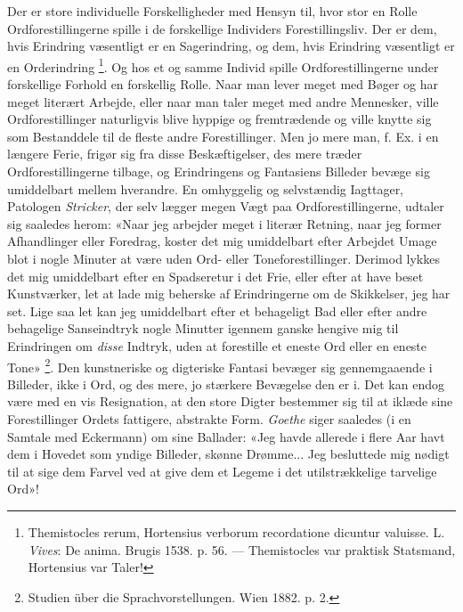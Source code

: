 \documentclass[12pt,a4paper,openany]{book}
\newcommand{\opage}[1]{\marginnote{\footnotesize\textit{[#1]}}}
\begin{document}
Der er store individuelle Forskelligheder med Hensyn til, hvor stor en Rolle
Ordforestillingerne spille i de forskellige Individers Forestillingsliv. Der er
dem, hvis Erindring væsentligt er en Sagerindring, og dem, hvis Erindring
væsentligt er en Orderindring%
\footnote[1]{Themistocles rerum, Hortensius verborum recordatione dicuntur
valuisse. L. \emph{Vives}: De anima. Brugis 1538. p. 56. --- Themistocles var
praktisk Statsmand, Hortensius var Taler!}. Og hos et og samme Individ spille
Ordforestillingerne under forskellige Forhold en forskellig Rolle. Naar man
lever meget med Bøger og har meget literært Arbejde, eller naar man taler meget
med andre Mennesker, ville Ordforestillinger naturligvis blive hyppige og
fremtrædende og ville knytte sig som Bestanddele til de fleste andre
Forestillinger. Men jo mere man, f. Ex. i en længere Ferie, frigør sig fra
disse Beskæftigelser, des mere træder Ordforestillingerne tilbage, og
Erindringens og Fantasiens Billeder bevæge sig umiddelbart mellem hverandre. En
omhyggelig og selvstændig Iagttager, Patologen \emph{Stricker}, der selv lægger
megen Vægt paa Ordforestillingerne, udtaler sig saaledes herom: «Naar jeg
arbejder meget i literær Retning, naar jeg former Afhandlinger eller Foredrag,
koster det mig umiddelbart efter Arbejdet Umage blot i nogle Minuter at være
uden Ord- eller Toneforestillinger. Derimod lykkes det mig umiddelbart efter en
Spadseretur i det Frie, eller efter at have beset Kunstværker, let at lade mig
beherske af Erindringerne om de Skikkelser, jeg har set. Lige saa let kan jeg
umiddelbart efter et behageligt Bad eller efter andre behagelige Sanseindtryk
nogle Minutter igennem ganske hengive mig til Erindringen om \emph{disse}
Indtryk, uden at forestille et eneste Ord eller en eneste Tone»%
\footnote[2]{Studien über die Sprachvorstellungen. Wien 1882. p. 2.}. Den
kunstneriske og digteriske Fantasi bevæger sig gennemgaaende i Billeder, ikke i
Ord, og des mere, jo stærkere Bevægelse den er i. Det kan endog være med en vis
Resignation, at den store Digter bestemmer sig til at iklæde sine
Forestillinger Ordets fattigere, abstrakte Form. \emph{Goethe} siger saaledes
(i en Samtale med Eckermann) om sine Ballader: «Jeg havde
\setcounter{footnote}{0}%
\opage{50}allerede i flere Aar havt dem i Hovedet som yndige Billeder, skønne
Drømme... Jeg besluttede mig nødigt til at sige dem Farvel ved at give dem et
Legeme i det utilstrækkelige tarvelige Ord»!
\end{document}
